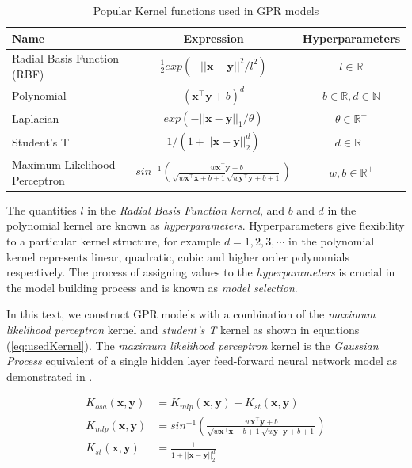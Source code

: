\documentclass{article}
\begin{document}
\begin{table}[h]
  \caption{Popular Kernel functions used in GPR models}
  \centering
  \begin{tabular}{l c c}
    \hline
    Name  & Expression & Hyperparameters  \\
    \hline
    Radial Basis Function (RBF)  & $\frac{1}{2} exp(-||\mathbf{x} - \mathbf{y}||^2/l^2)$  & $l \in \mathbb{R}$   \\
    
    Polynomial  & $(\mathbf{x}^\intercal \mathbf{y} + b)^d$ & $b \in \mathbb{R}, d \in \mathbb{N}$   \\
    
    Laplacian  & $exp(-||\mathbf{x} - \mathbf{y}||_{1}/\theta)$  & $\theta \in \mathbb{R}^+$  \\
    
    Student's T  & $1/(1 + ||\mathbf{x} - \mathbf{y}||_{2}^d)$ & $d \in \mathbb{R}^{+}$\\
    
    Maximum Likelihood Perceptron  & $sin^{-1}(\frac{w\mathbf{x}^\intercal \mathbf{y} + b}{\sqrt{w\mathbf{x}^\intercal \mathbf{x} + b + 1} \sqrt{w\mathbf{y}^\intercal \mathbf{y} + b + 1}})$ & $w, b \in \mathbb{R}^{+}$\\
    \hline
  \end{tabular}
  \label{table:kernel}
\end{table}

The quantities $l$ in the \emph{Radial Basis Function kernel}, and $b$
and $d$ in the polynomial kernel are known as
\emph{hyperparameters}. Hyperparameters give flexibility to a
particular kernel structure, for example $d = 1, 2, 3, \cdots$ in the
polynomial kernel represents linear, quadratic, cubic and higher order
polynomials respectively. The process of assigning values to the
\emph{hyperparameters} is crucial in the model building process and is
known as \emph{model selection}. 

In this text, we construct GPR models with a combination of the
\emph{maximum likelihood perceptron} kernel and \emph{student's T}
kernel as shown in equations (\ref{eq:usedKernel}). The \emph{maximum
  likelihood perceptron} kernel is the \emph{Gaussian Process}
equivalent of a single hidden layer feed-forward neural network model
as demonstrated in \citet{Neal:1996:BLN:525544}.

\begin{align}
  K_{osa}(\mathbf{x}, \mathbf{y}) & = K_{mlp}(\mathbf{x}, \mathbf{y}) + K_{st}(\mathbf{x}, \mathbf{y}) \label{eq:usedKernel} \\
  K_{mlp}(\mathbf{x}, \mathbf{y}) & = sin^{-1}(\frac{w\mathbf{x}^\intercal \mathbf{y} + b}{\sqrt{w\mathbf{x}^\intercal \mathbf{x} + b + 1} \sqrt{w\mathbf{y}^\intercal \mathbf{y} + b + 1}}) \\
  K_{st}(\mathbf{x}, \mathbf{y}) & = \frac{1}{1 + ||\mathbf{x} - \mathbf{y}||_{2}^d}
\end{align}
\end{document}
